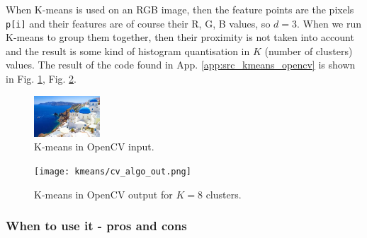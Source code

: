 \documentclass[a4paper]{article}
\begin{document}
When K-means is used on an RGB image, then the feature points are the pixels \texttt{p[i]} and their features are of course their R, G, B values, so $d=3$. When we run K-means to group them together, then their proximity is not taken into account and the result is some kind of histogram quantisation in $K$ (number of clusters) values. The result of the code found in App. \ref{app:src_kmeans_opencv} is shown in Fig. \ref{fig:k_means_cv_input}, Fig. \ref{fig:k_means_cv_output}.

\begin{multicols}{2}
\begin{figure}[H]
	\centering %
    	\includegraphics[width=0.22\textwidth]{src/kmeans/santorini.jpg}
    \caption{K-means in OpenCV input.}
    \label{fig:k_means_cv_input}
\end{figure}

\columnbreak
\begin{figure}[H]
	\centering %
    	\texttt{[image: kmeans/cv\_algo\_out.png]}
    \caption{K-means in OpenCV output for $K=8$ clusters.}
    \label{fig:k_means_cv_output}
\end{figure}
\end{multicols}


\subsubsection{When to use it - pros and cons}
\end{document}
